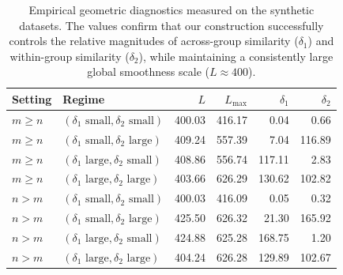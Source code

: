 \documentclass{article}
\theoremstyle{plain}
\begin{document}
\begin{table}[t]
    \centering
    \setlength{\tabcolsep}{5pt}
    \begin{tabular}{llrrrr}
        \toprule
        \textbf{Setting} & \textbf{Regime} & $L$ & $L_{\max}$ & $\delta_1$ & $\delta_2$ \\
        \midrule
        $m\ge n$ & $(\delta_1 \text{ small}, \delta_2 \text{ small})$ & 400.03 & 416.17 & 0.04 & 0.66 \\
        $m\ge n$ & $(\delta_1 \text{ small}, \delta_2 \text{ large})$ & 409.24 & 557.39 & 7.04 & 116.89 \\
        $m\ge n$ & $(\delta_1 \text{ large}, \delta_2 \text{ small})$ & 408.86 & 556.74 & 117.11 & 2.83 \\
        $m\ge n$ & $(\delta_1 \text{ large}, \delta_2 \text{ large})$ & 403.66 & 626.29 & 130.62 & 102.82 \\
        \midrule
        $n>m$ & $(\delta_1 \text{ small}, \delta_2 \text{ small})$ & 400.03 & 416.09 & 0.05 & 0.32 \\
        $n>m$ & $(\delta_1 \text{ small}, \delta_2 \text{ large})$ & 425.50 & 626.32 & 21.30 & 165.92 \\
        $n>m$ & $(\delta_1 \text{ large}, \delta_2 \text{ small})$ & 424.88 & 625.28 & 168.75 & 1.20 \\
        $n>m$ & $(\delta_1 \text{ large}, \delta_2 \text{ large})$ & 404.24 & 626.28 & 129.89 & 102.67 \\
        \bottomrule
    \end{tabular}
    \caption{
    Empirical geometric diagnostics measured on the synthetic datasets. The values confirm that our construction successfully controls the relative magnitudes of across-group similarity ($\delta_1$) and within-group similarity ($\delta_2$), while maintaining a consistently large global smoothness scale ($L \approx 400$).
    }
    \label{tab:synthetic-regimes}
\end{table}
\end{document}
